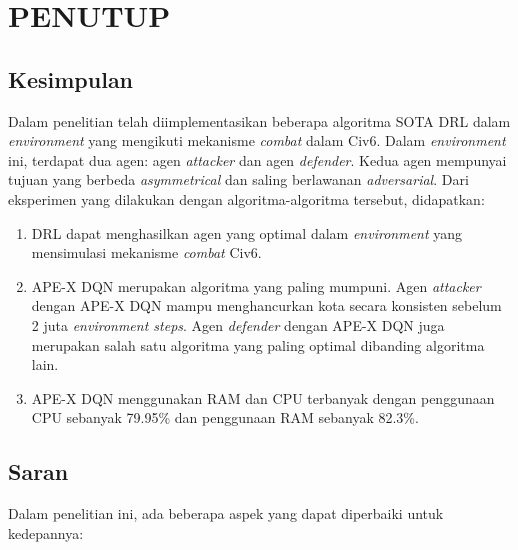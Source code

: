 \chapter{PENUTUP}
\label{chap:penutup}


\section{Kesimpulan}
\label{sec:kesimpulan}

Dalam penelitian telah diimplementasikan beberapa algoritma SOTA DRL dalam \emph{environment}
yang mengikuti mekanisme \emph{combat} dalam Civ6.
Dalam \emph{environment} ini, terdapat dua agen: agen \emph{attacker} dan agen \emph{defender}.
Kedua agen mempunyai tujuan yang berbeda \emph{asymmetrical} dan saling berlawanan \emph{adversarial}.
Dari eksperimen yang dilakukan dengan algoritma-algoritma tersebut, didapatkan:

\begin{enumerate}[nolistsep]

  \item DRL dapat menghasilkan agen yang optimal dalam \emph{environment} yang mensimulasi mekanisme \emph{combat}
  Civ6.

  \item APE-X DQN merupakan algoritma yang paling mumpuni. Agen \emph{attacker} dengan APE-X DQN mampu
  menghancurkan kota secara konsisten sebelum 2 juta \emph{environment steps}.
  Agen \emph{defender} dengan APE-X DQN juga merupakan salah satu algoritma yang paling optimal
  dibanding algoritma lain.

  \item APE-X DQN menggunakan RAM dan CPU terbanyak dengan penggunaan CPU sebanyak 79.95\% dan penggunaan
  RAM sebanyak 82.3\%.

\end{enumerate}

\section{Saran}
\label{chap:saran}

Dalam penelitian ini, ada beberapa aspek yang dapat diperbaiki untuk kedepannya:

